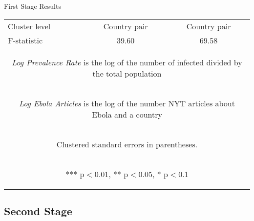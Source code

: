 \documentclass[11pt]{beamer}
\begin{document}
\begin{frame}{First Stage Results}
\begin{center}
\begin{table}[htbp]
{\begin{tabular}{lcc}
Cluster level & Country pair & Country pair \\
F-statistic & 39.60 & 69.58 \\ \hline
\multicolumn{3}{c}{\begin{footnotesize} \textit{Log Prevalence Rate} is the log of the number of infected divided by the total population \end{footnotesize} }\\
\multicolumn{3}{c}{\begin{footnotesize} \textit{Log Ebola Articles} is the log of the number NYT articles about Ebola and a country \end{footnotesize} }\\
\multicolumn{3}{c}{\begin{footnotesize} Clustered standard errors in parentheses. \end{footnotesize} }\\
\multicolumn{3}{c}{\begin{footnotesize} *** p$<$0.01, ** p$<$0.05, * p$<$0.1\end{footnotesize}} \\
\end{tabular}
}
\end{table}
\end{center}

\end{frame}




\subsection{Second Stage}
\end{document}
